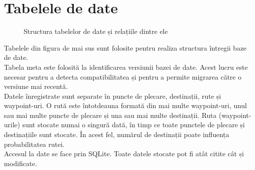 \label{cap4}


\label{Chapter4} %

\thispagestyle{fancy}

\section{Tabelele de date}


\begin{figure}[h!]
  \centering
  \caption{Structura tabelelor de date și relațiile dintre ele}
\end{figure}

Tabelele din figura de mai sus sunt folosite pentru realiza structura întregii baze de date.
\vspace{6pt}
\\Tabela meta este folosită la identificarea versiunii bazei de date. Acest lucru este necesar pentru a detecta compatibilitatea și pentru a permite migrarea către o versiune mai recentă. 
\vspace{6pt}
\\Datele înregistrate sunt separate în puncte de plecare, destinații, rute și waypoint-uri. O rută este întotdeauna formată din mai multe waypoint-uri, unul sau mai multe puncte de plecare și una sau mai multe destinații. Ruta (waypoint-urile) sunt stocate numai o singură dată, în timp ce toate punctele de plecare și destinațiile sunt stocate. În acest fel, numărul de destinații poate influența probabilitatea rutei.
\vspace{6pt}
\\Accesul la date se face prin SQLite. Toate datele stocate pot fi atât citite cât și modificate.


